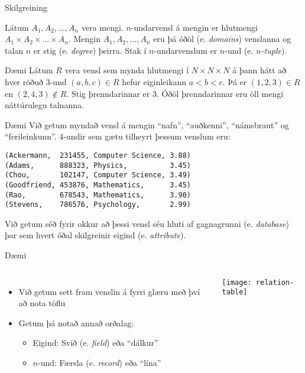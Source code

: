 \documentclass{beamer}
\begin{document}
\begin{frame}{Skilgreining}
\begin{tcolorbox}[title=n-undarvensl]
Látum $A_1, A_2, \ldots, A_n$ vera mengi. $n$-undarvensl á mengin er hlutmengi $A_1 \times A_2 \times \ldots \times A_n$. Mengin $A_1, A_2, \ldots, A_n$ eru þá óðöl (e. \emph{domains}) venslanna og talan $n$ er stig (e. \emph{degree}) þeirra. Stak í $n$-undarvenslum er $n$-und (e. \emph{$n$-tuple}).
\end{tcolorbox}
\end{frame}

\begin{frame}{Dæmi}
Látum $R$ vera vensl sem mynda hlutmengi í $N \times N \times N$ á þann hátt að hver röðuð 3-und $(a, b, c) \in R$ hefur eiginleikann $a < b < c$. Þá er $(1, 2, 3) \in R$ en $(2, 4, 3) \notin R$. Stig þrenndarinnar er 3. Óðöl þrenndarinnar eru öll mengi náttúrulegu talnanna.
\end{frame}

\begin{frame}[fragile]{Dæmi}
Við getum myndað vensl á mengin ``nafn'', ``auðkenni'', ``námsbraut'' og ``ferileinkunn''. 4-undir sem gætu tilheyrt þessum venslum eru:

\begin{verbatim}
(Ackermann,  231455, Computer Science, 3.88)
(Adams,      888323, Physics,          3.45)
(Chou,       102147, Computer Science, 3.49)
(Goodfriend, 453876, Mathematics,      3.45)
(Rao,        678543, Mathematics,      3.90)
(Stevens,    786576, Psychology,       2.99)
\end{verbatim}
Við getum séð fyrir okkur að þessi vensl séu hluti af gagnagrunni (e. \emph{database}) þar sem hvert óðal skilgreinir eigind (e. \emph{attribute}). 
\end{frame}

\begin{frame}[fragile]{Dæmi}
\begin{columns}
\begin{itemize}
 \item Við getum sett fram venslin á fyrri glæru með því að nota töflu
 \item Getum þá notað annað orðalag:
 \begin{itemize}
  \item Eigind: Svið (e. \emph{field}) eða ``dálkur''
  \item $n$-und: Færsla (e. \emph{record}) eða ``lína''
 \end{itemize}
\end{itemize}
\begin{center}
\texttt{[image: relation-table]}
\end{center}
\end{columns}
\end{frame}
\end{document}
